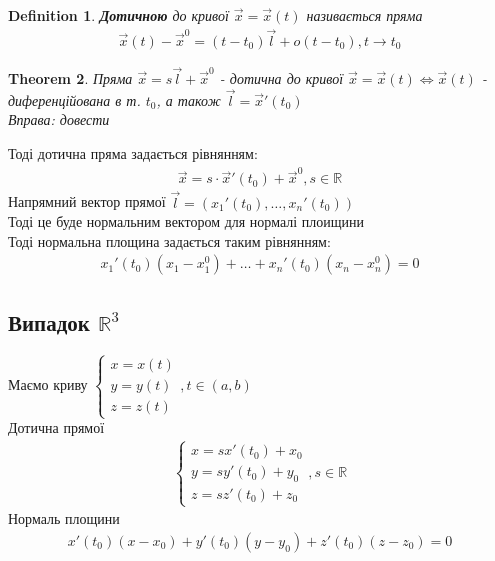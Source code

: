 \documentclass[a4paper, 14pt]{extarticle}
\theoremstyle{theoremdd}
\newtheorem{theorem}{Theorem}[subsection]
\theoremstyle{theoremdd}
\newtheorem{definition}[theorem]{Definition}
\theoremstyle{theoremdd}
\theoremstyle{theoremdd}
\theoremstyle{theoremdd}
\theoremstyle{theoremdd}
\theoremstyle{theoremdd}
\begin{document}
\begin{definition}
\textbf{Дотичною} до кривої $\vec{x} = \vec{x}(t)$ називається пряма
\begin{align*}
\vec{x}(t) - \vec{x}^0 = (t-t_0) \vec{l} + o(t-t_0), t \to t_0
\end{align*}
\end{definition}

\begin{theorem}
Пряма $\vec{x} = s \vec{l} + \vec{x}^0$ - дотична до кривої $\vec{x} = \vec{x}(t) \iff \vec{x}(t)$ - диференційована в т. $t_0$, а також $\vec{l} = \vec{x}'(t_0)$\\
\textit{Вправа: довести}
\end{theorem}
Тоді дотична пряма задається рівнянням:
\begin{align*}
\vec{x} = s \cdot \vec{x}'(t_0) + \vec{x}^0, s \in \mathbb{R}
\end{align*}
Напрямний вектор прямої $\vec{l} = (x_1'(t_0),\dots, x_n'(t_0))$\\
Тоді це буде нормальним вектором для нормалі плоищини\\
Тоді нормальна площина задається таким рівнянням:
\begin{align*}
x_1'(t_0)(x_1-x_1^0) + \dots + x_n'(t_0)(x_n-x_n^0)=0
\end{align*}

\subsection*{Випадок $\mathbb{R}^3$}
Маємо криву $\begin{cases} x=x(t) \\ y=y(t) \\ z=z(t) \end{cases}, t \in (a,b)$\\
Дотична прямої
\begin{align*}
\begin{cases}
x=s x'(t_0)+x_0 \\
y=s y'(t_0)+y_0\\
z=s z'(t_0)+z_0
\end{cases}, s \in \mathbb{R}
\end{align*}
Нормаль площини
\begin{align*}
x'(t_0)(x-x_0)+y'(t_0)(y-y_0)+z'(t_0)(z-z_0)=0
\end{align*}
\end{document}
